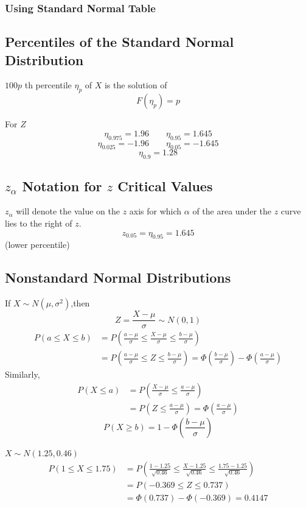 \subsubsection{Using Standard Normal Table}

\subsection{Percentiles of the Standard Normal Distribution}
$100p$ th percentile $\eta_{p}$ of $X$ is the solution of 
\[F(\eta_p)=p\]

\begin{exmp}
For $Z$
\[\eta_{0.975}=1.96 \qquad \eta_{0.95}=1.645\]
\[\eta_{0.025}=-1.96 \qquad \eta_{0.05}=-1.645\]
\[\eta_{0.9}=1.28\]
\end{exmp}


\subsection{$z_{\alpha}$ Notation for $z$ Critical Values}
$z_{\alpha}$ will denote the value on the $z$ axis for which $\alpha$ of the area under the $z$ curve lies to the right of $z$. 
\[z_{0.05}=\eta_{0.95}=1.645\]
(lower percentile)
\subsection{Nonstandard Normal Distributions}
If $X \sim N(\mu,\sigma^2) $,then
\[Z=\frac{X-\mu}{\sigma} \sim N(0,1)\]
\begin{align*}
P(a\leq X\leq b) &= P \left(\frac{a-\mu}{\sigma} \leq \frac{X-\mu}{\sigma} \leq \frac{b-\mu}{\sigma} \right)  \\
& = P \left( \frac{a-\mu}{\sigma} \leq Z \leq \frac{b-\mu}{\sigma} \right) =\Phi \left(\frac{b-\mu}{\sigma} \right)- \Phi \left(\frac{a-\mu}{\sigma} \right)
\end{align*}
Similarly,
\begin{align*}
P(X\leq a) &= P \left(\frac{X-\mu}{\sigma} \leq \frac{a-\mu}{\sigma} \right)  \\
& = P \left(  Z \leq \frac{a-\mu}{\sigma} \right) =\Phi \left(\frac{a-\mu}{\sigma} \right)
\end{align*}
\[P(X \geq b)=1-\Phi \left(\frac{b-\mu}{\sigma} \right)\]

\begin{exmp}
$X \sim N(1.25,0.46)$
\begin{align*}
P(1 \leq X\leq 1.75) &= P \left(\frac{1-1.25}{\sqrt{0.46}} \leq \frac{X-1.25}{\sqrt{0.46}} \leq \frac{1.75-1.25}{\sqrt{0.46}} \right)  \\
& = P \left( -0.369 \leq Z \leq 0.737 \right)\\
&=\Phi \left(0.737 \right)- \Phi \left(-0.369 \right)=\boxed{0.4147}
\end{align*}
\end{exmp}

